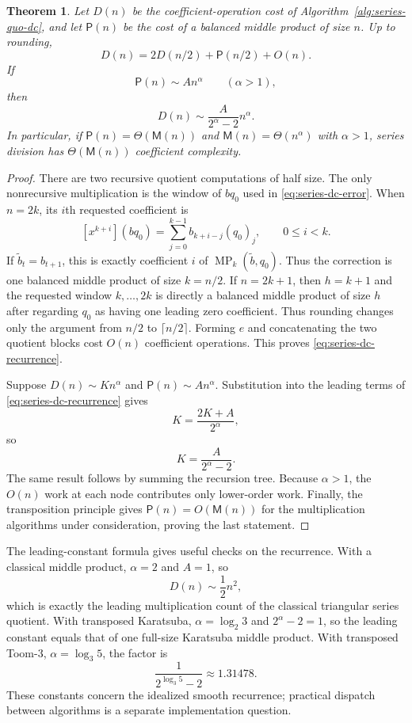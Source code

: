 \documentclass[11pt]{book}
\newtheorem{theorem}{Theorem}[section]
\theoremstyle{definition}
\begin{document}
\begin{theorem}\label{thm:series-quo-dc-complexity}
Let $D(n)$ be the coefficient-operation cost of
Algorithm~\ref{alg:series-quo-dc}, and let $\mathsf P(n)$ be the cost of a
balanced middle product of size $n$.  Up to rounding,
\begin{equation}\label{eq:series-dc-recurrence}
 D(n)=2D(n/2)+\mathsf P(n/2)+O(n).
\end{equation}
If
\[
 \mathsf P(n)\sim A n^\alpha
 \qquad (\alpha>1),
\]
then
\begin{equation}\label{eq:series-dc-leading}
 D(n)\sim \frac{A}{2^\alpha-2}n^\alpha.
\end{equation}
In particular, if $\mathsf P(n)=\Theta(\mathsf M(n))$ and
$\mathsf M(n)=\Theta(n^\alpha)$ with $\alpha>1$, series division has
$\Theta(\mathsf M(n))$ coefficient complexity.
\end{theorem}

\begin{proof}
There are two recursive quotient computations of half size.  The only
nonrecursive multiplication is the window of $bq_0$ used in
\eqref{eq:series-dc-error}.  When $n=2k$, its $i$th requested coefficient is
\[
 [x^{k+i}](bq_0)
 =\sum_{j=0}^{k-1} b_{k+i-j}(q_0)_j,
 \qquad 0\leq i<k.
\]
If $\widetilde b_t=b_{t+1}$, this is exactly coefficient $i$ of
$\operatorname{MP}_k(\widetilde b,q_0)$.  Thus the correction is one balanced
middle product of size $k=n/2$.  If $n=2k+1$, then $h=k+1$ and the requested
window $k,\ldots,2k$ is directly a balanced middle product of size $h$ after
regarding $q_0$ as having one leading zero coefficient.  Thus rounding changes
only the argument from $n/2$ to $\lceil n/2\rceil$.  Forming $e$ and
concatenating the two quotient blocks cost $O(n)$ coefficient operations.  This
proves \eqref{eq:series-dc-recurrence}.

Suppose $D(n)\sim Kn^\alpha$ and $\mathsf P(n)\sim An^\alpha$.  Substitution
into the leading terms of \eqref{eq:series-dc-recurrence} gives
\[
 K=\frac{2K+A}{2^\alpha},
\]
so
\[
 K=\frac{A}{2^\alpha-2}.
\]
The same result follows by summing the recursion tree.  Because $\alpha>1$,
the $O(n)$ work at each node contributes only lower-order work.  Finally, the
transposition principle gives $\mathsf P(n)=O(\mathsf M(n))$ for the
multiplication algorithms under consideration, proving the last statement.
\end{proof}

The leading-constant formula gives useful checks on the recurrence.  With a
classical middle product, $\alpha=2$ and $A=1$, so
\[
 D(n)\sim \frac12n^2,
\]
which is exactly the leading multiplication count of the classical triangular
series quotient.  With transposed Karatsuba,
$\alpha=\log_2 3$ and $2^\alpha-2=1$, so the leading constant equals that of
one full-size Karatsuba middle product.  With transposed Toom-3,
$\alpha=\log_3 5$, the factor is
\[
 \frac1{2^{\log_3 5}-2}\approx1.31478.
\]
These constants concern the idealized smooth recurrence; practical dispatch
between algorithms is a separate implementation question.
\end{document}
